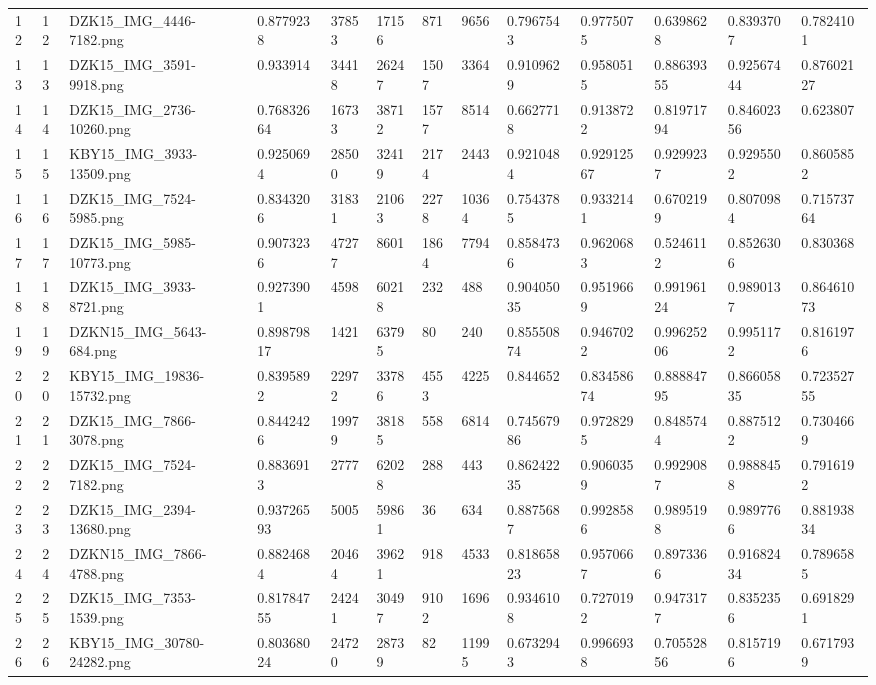 \documentclass[11pt, a4paper, twoside]{report}
\begin{document}
\begin{longtable}[c]{@{}lllllllllllll@{}}
12 & 12 & DZK15\_IMG\_4446-7182.png & 0.8779238 & 37853 & 17156 & 871 & 9656 & 0.7967543 & 0.9775075 & 0.6398628 & 0.8393707 & 0.7824101 \\
13 & 13 & DZK15\_IMG\_3591-9918.png & 0.933914 & 34418 & 26247 & 1507 & 3364 & 0.9109629 & 0.9580515 & 0.88639355 & 0.92567444 & 0.87602127 \\
14 & 14 & DZK15\_IMG\_2736-10260.png & 0.76832664 & 16733 & 38712 & 1577 & 8514 & 0.6627718 & 0.9138722 & 0.81971794 & 0.84602356 & 0.623807 \\
15 & 15 & KBY15\_IMG\_3933-13509.png & 0.9250694 & 28500 & 32419 & 2174 & 2443 & 0.9210484 & 0.92912567 & 0.9299237 & 0.9295502 & 0.8605852 \\
16 & 16 & DZK15\_IMG\_7524-5985.png & 0.8343206 & 31831 & 21063 & 2278 & 10364 & 0.7543785 & 0.9332141 & 0.6702199 & 0.8070984 & 0.71573764 \\
17 & 17 & DZK15\_IMG\_5985-10773.png & 0.9073236 & 47277 & 8601 & 1864 & 7794 & 0.8584736 & 0.9620683 & 0.5246112 & 0.8526306 & 0.830368 \\
18 & 18 & DZK15\_IMG\_3933-8721.png & 0.9273901 & 4598 & 60218 & 232 & 488 & 0.90405035 & 0.9519669 & 0.99196124 & 0.9890137 & 0.86461073 \\
19 & 19 & DZKN15\_IMG\_5643-684.png & 0.89879817 & 1421 & 63795 & 80 & 240 & 0.85550874 & 0.9467022 & 0.99625206 & 0.9951172 & 0.8161976 \\
20 & 20 & KBY15\_IMG\_19836-15732.png & 0.8395892 & 22972 & 33786 & 4553 & 4225 & 0.844652 & 0.83458674 & 0.88884795 & 0.86605835 & 0.72352755 \\
21 & 21 & DZK15\_IMG\_7866-3078.png & 0.8442426 & 19979 & 38185 & 558 & 6814 & 0.74567986 & 0.9728295 & 0.8485744 & 0.8875122 & 0.7304669 \\
22 & 22 & DZK15\_IMG\_7524-7182.png & 0.8836913 & 2777 & 62028 & 288 & 443 & 0.86242235 & 0.9060359 & 0.9929087 & 0.9888458 & 0.7916192 \\
23 & 23 & DZK15\_IMG\_2394-13680.png & 0.93726593 & 5005 & 59861 & 36 & 634 & 0.8875687 & 0.9928586 & 0.9895198 & 0.9897766 & 0.88193834 \\
24 & 24 & DZKN15\_IMG\_7866-4788.png & 0.8824684 & 20464 & 39621 & 918 & 4533 & 0.81865823 & 0.9570667 & 0.8973366 & 0.91682434 & 0.7896585 \\
25 & 25 & DZK15\_IMG\_7353-1539.png & 0.81784755 & 24241 & 30497 & 9102 & 1696 & 0.9346108 & 0.7270192 & 0.9473177 & 0.8352356 & 0.6918291 \\
26 & 26 & KBY15\_IMG\_30780-24282.png & 0.80368024 & 24720 & 28739 & 82 & 11995 & 0.6732943 & 0.9966938 & 0.70552856 & 0.8157196 & 0.6717939 \\

\end{longtable}
\end{document}
